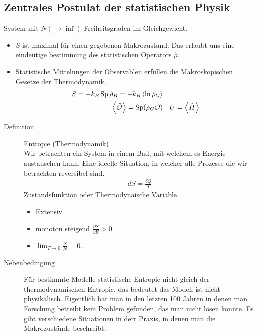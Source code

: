 \documentclass[11pt]{article}
\theoremstyle{plain}
\newcommand{\pd}[2]{\frac{\partial #1 }{\partial #2}}
\begin{document}
\subsection*{Zentrales Postulat der statistischen Physik}
System mit $N(\to \inf{})$ Freiheitsgraden im Gleichgewicht.
\begin{itemize}
  \item $S$ ist maximal f\"ur einen gegebenen Makrozustand. Das erlaubt uns
    eine eindeutige bestimmung des statistischen Operators $\hat{\rho}$.
  \item Statistische Mittelungen der Observablen erf\"ullen die Makroskopischen
    Gesetze der Thermodynamik.
    \begin{align*}
      S = -k_B \operatorname{Sp} \hat{\rho}_B = - k_B \Braket{\ln{\hat{\rho}_G}} \\
      \Braket{\hat{\cal{O}}}= \operatorname{Sp} (\hat{\rho}_G \mathcal{O}) &&
      U = \Braket{\hat{H}}
    \end{align*}
\end{itemize}
\begin{description}
  \item[Definition] Entropie (Thermodynamik) \\
    Wir betrachten ein System in einem Bad, mit welchem es Energie austauschen
    kann. Eine ideelle Situation, in welcher alle Prozesse die wir betrachten 
    reversibel sind. 
    \begin{align*}
      dS = \frac{\delta Q}{T}
    \end{align*}
    Zustandsfunktion oder Thermodynaische Variable.
    \begin{itemize}
      \item Extensiv
      \item monoton steigend $\pd{S}{E} > 0$
      \item $ \lim_{T \to 0} \frac{S}{N} = 0$.
    \end{itemize}
\end{description}
\begin{description}
  \item[Nebenbedingung] F\"ur bestimmte Modelle statistische Entropie nicht
    gleich der thermodynamischen Entropie, das bedeutet das Modell ist nicht
    physikalisch. Eigentlich hat man in den letzten 100 Jahren in denen man
    Forschung betreibt kein Problem gefunden, das man nicht l\"osen konnte.
    Es gibt verschiedene Situationen in derr Praxis, in denen man die Makrozust\"ande
    beschreibt. 
\end{description}
\end{document}
